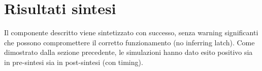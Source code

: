 \documentclass[a4paper,12pt]{article}
\begin{document}
\section{Risultati sintesi}
Il componente descritto viene sintetizzato con successo, senza warning significanti che possono compromettere il corretto funzionamento (no inferring latch). Come dimostrato dalla sezione precedente, le simulazioni hanno dato esito positivo sia in pre-sintesi sia in post-sintesi (con timing).
\end{document}
